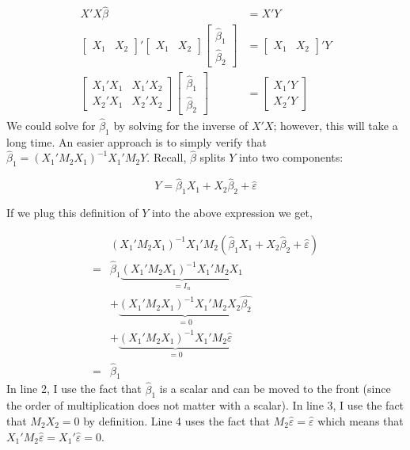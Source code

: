 \documentclass[
  letterpaper,
  DIV=11,
  numbers=noendperiod]{scrreprt}
\begin{document}
\[
\begin{align}
X'X\hat{\beta} &= X'Y \\
\begin{bmatrix}X_1 & X_2\end{bmatrix}'\begin{bmatrix}X_1 & X_2\end{bmatrix}\begin{bmatrix}\hat{\beta}_1 \\ \hat{\beta}_2\end{bmatrix} &= \begin{bmatrix}X_1 & X_2\end{bmatrix}'Y \\
\begin{bmatrix}X_1'X_1 & X_1'X_2 \\ X_2'X_1 & X_2'X_2 \end{bmatrix}\begin{bmatrix}\hat{\beta}_1 \\ \hat{\beta}_2\end{bmatrix} &= \begin{bmatrix}X_1'Y \\ X_2'Y\end{bmatrix}
\end{align}
\] We could solve for \(\hat{\beta}_1\) by solving for the inverse of
\(X'X\); however, this will take a long time. An easier approach is to
simply verify that \(\hat{\beta}_1=(X_1'M_2X_1)^{-1}X_1'M_2Y\). Recall,
\(\hat{\beta}\) splits \(Y\) into two components:

\[
Y = \hat{\beta}_1X_1+X_2\hat{\beta}_2 + \hat{\varepsilon}
\]

If we plug this definition of \(Y\) into the above expression we get,

\[
\begin{align}
&(X_1'M_2X_1)^{-1}X_1'M_2(\hat{\beta}_1X_1+X_2\hat{\beta}_2 + \hat{\varepsilon}) \\
=&\hat{\beta}_1\underbrace{(X_1'M_2X_1)^{-1}X_1'M_2X_1}_{=I_n} \\
&+\underbrace{(X_1'M_2X_1)^{-1}X_1'M_2X_2\hat{\beta_2}}_{=0} \\
&+\underbrace{(X_1'M_2X_1)^{-1}X_1'M_2\hat{\varepsilon}}_{=0} \\
=&\hat{\beta}_1
\end{align}
\] In line 2, I use the fact that \(\hat{\beta}_1\) is a scalar and can
be moved to the front (since the order of multiplication does not matter
with a scalar). In line 3, I use the fact that \(M_2X_2=0\) by
definition. Line 4 uses the fact that
\(M_2\hat{\varepsilon}=\hat{\varepsilon}\) which means that
\(X_1'M_2\hat{\varepsilon}=X_1'\hat{\varepsilon}=0\).
\end{document}

